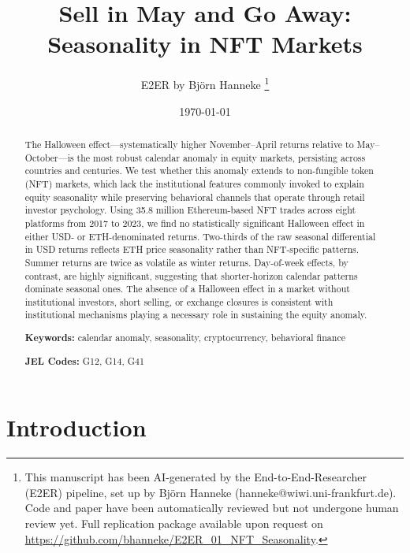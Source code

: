 \documentclass[12pt,a4paper]{article}
\title{\textbf{Sell in May and Go Away: \\ Seasonality in NFT Markets}}
\author{
  E2ER by Bj\"{o}rn Hanneke
  \thanks{This manuscript has been AI-generated by the End-to-End-Researcher (E2ER) pipeline, set up by Bj\"{o}rn Hanneke (hanneke@wiwi.uni-frankfurt.de). Code and paper have been automatically reviewed but not undergone human review yet. Full replication package available upon request on \url{https://github.com/bhanneke/E2ER_01_NFT_Seasonality}.}
}
\date{\today}
\begin{document}
\maketitle


\begin{abstract}
\noindent
The Halloween effect---systematically higher November--April returns relative to May--October---is the most robust calendar anomaly in equity markets, persisting across countries and centuries. We test whether this anomaly extends to non-fungible token (NFT) markets, which lack the institutional features commonly invoked to explain equity seasonality while preserving behavioral channels that operate through retail investor psychology. Using 35.8 million Ethereum-based NFT trades across eight platforms from 2017 to 2023, we find no statistically significant Halloween effect in either USD- or ETH-denominated returns. Two-thirds of the raw seasonal differential in USD returns reflects ETH price seasonality rather than NFT-specific patterns. Summer returns are twice as volatile as winter returns. Day-of-week effects, by contrast, are highly significant, suggesting that shorter-horizon calendar patterns dominate seasonal ones. The absence of a Halloween effect in a market without institutional investors, short selling, or exchange closures is consistent with institutional mechanisms playing a necessary role in sustaining the equity anomaly.

\medskip
\noindent\textbf{Keywords:} calendar anomaly, seasonality, cryptocurrency, behavioral finance

\noindent\textbf{JEL Codes:} G12, G14, G41
\end{abstract}

\newpage


\section{Introduction}\label{sec:intro}
\end{document}
